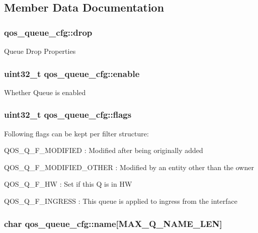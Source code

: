 \subsection{Member Data Documentation}
\hypertarget{structqos__queue__cfg_a6fb4600c84f6821fb50126c65f32d403}{
\subsubsection[{drop}]{ qos\-\_\-queue\-\_\-cfg\-::drop}}\label{structqos__queue__cfg_a6fb4600c84f6821fb50126c65f32d403}
Queue Drop Properties \hypertarget{structqos__queue__cfg_a9f29f1f01fcceaa20a155f384d2ba1ba}{
\subsubsection[{enable}]{\setlength{\rightskip}{0pt plus 5cm}uint32\-\_\-t qos\-\_\-queue\-\_\-cfg\-::enable}}\label{structqos__queue__cfg_a9f29f1f01fcceaa20a155f384d2ba1ba}
Whether Queue is enabled \hypertarget{structqos__queue__cfg_ae62e947c5c062e477347f21b34586901}{
\subsubsection[{flags}]{\setlength{\rightskip}{0pt plus 5cm}uint32\-\_\-t qos\-\_\-queue\-\_\-cfg\-::flags}}\label{structqos__queue__cfg_ae62e947c5c062e477347f21b34586901}
Following flags can be kept per filter structure\-:
\begin{DoxyItemize}
\item Q\-O\-S\-\_\-\-Q\-\_\-\-F\-\_\-\-M\-O\-D\-I\-F\-I\-E\-D \-: Modified after being originally added
\item Q\-O\-S\-\_\-\-Q\-\_\-\-F\-\_\-\-M\-O\-D\-I\-F\-I\-E\-D\-\_\-\-O\-T\-H\-E\-R \-: Modified by an entity other than the owner
\item Q\-O\-S\-\_\-\-Q\-\_\-\-F\-\_\-\-H\-W \-: Set if this Q is in H\-W
\item Q\-O\-S\-\_\-\-Q\-\_\-\-F\-\_\-\-I\-N\-G\-R\-E\-S\-S \-: This queue is applied to ingress from the interface 
\end{DoxyItemize}\hypertarget{structqos__queue__cfg_a1a3367219d1ddc63ec994f57bbeb59f0}{
\subsubsection[{name}]{\setlength{\rightskip}{0pt plus 5cm}char qos\-\_\-queue\-\_\-cfg\-::name\mbox{[}{\bf M\-A\-X\-\_\-\-Q\-\_\-\-N\-A\-M\-E\-\_\-\-L\-E\-N}\mbox{]}}}\label{structqos__queue__cfg_a1a3367219d1ddc63ec994f57bbeb59f0}
